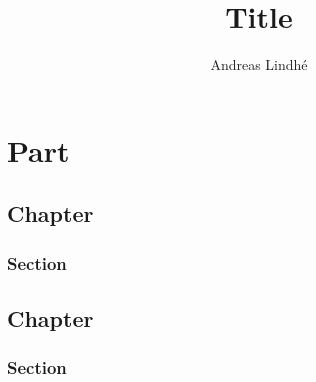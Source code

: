 \documentclass[a4paper]{report}
\title{Title}
\author{Andreas Lindhé} %
\begin{document}
\maketitle

\tableofcontents

\abstract

\lipsum[1]

\part{Part}

\chapter{Chapter}

\section{Section} %

%

\lipsum[1-2]

%
%

\appendix 

\chapter{Chapter}

\section{Section}

%

\lipsum[1-2]
\end{document}
